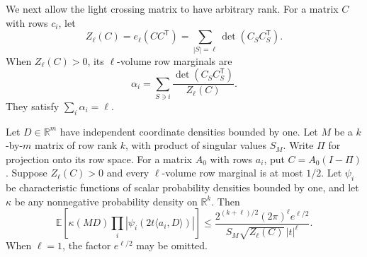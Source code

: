 We next allow the light crossing matrix to have arbitrary
rank.  For a matrix \(C\) with rows \(c_i\), let
\[
 Z_\ell(C)=e_\ell(CC^{\mathsf T})
 =\sum_{|S|=\ell}\det(C_SC_S^{\mathsf T}).
\]
When \(Z_\ell(C)>0\), its \(\ell\)-volume row marginals are
\[
 \alpha_i=\sum_{S\ni i}
 \frac{\det(C_SC_S^{\mathsf T})}{Z_\ell(C)}.
\]
They satisfy \(\sum_i\alpha_i=\ell\).

\begin{lemma}
\label{lem:weighted-subset}
Let \(D\in\mathbb R^m\) have independent coordinate
densities bounded by one.  Let \(M\) be a \(k\)-by-\(m\)
matrix of row rank \(k\), with product of singular values
\(S_M\).  Write \(\Pi\) for projection onto its row space.
For a matrix \(A_0\) with rows \(a_i\), put
\(C=A_0(I-\Pi)\).
Suppose \(Z_\ell(C)>0\) and every \(\ell\)-volume row
marginal is at most \(1/2\).
Let \(\psi_i\) be characteristic functions of scalar
probability densities bounded by one, and let \(\kappa\)
be any nonnegative probability density on \(\mathbb R^k\).
Then
\begin{equation}
 \mathbb E\left[\kappa(MD)
     \prod_i|\psi_i(2t\langle a_i,D\rangle)|\right]
 \leq
 \frac{2^{(k+\ell)/2}(2\pi)^\ell e^{\ell/2}}
 {S_M\sqrt{Z_\ell(C)}\,|t|^\ell}.
 \label{eq:weighted-subset}
\end{equation}
When \(\ell=1\), the factor \(e^{\ell/2}\) may be omitted.
\end{lemma}
